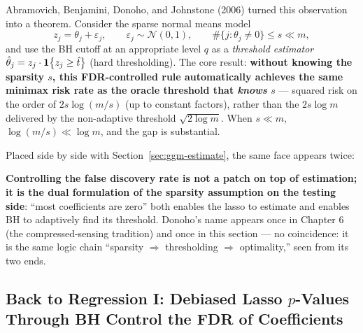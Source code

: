 Abramovich, Benjamini, Donoho, and Johnstone (2006) turned this observation into a theorem\cite{abramovich2006}. Consider the sparse normal means model
\[
  z_j = \theta_j + \varepsilon_j, \qquad \varepsilon_j \sim \mathcal{N}(0, 1),
  \qquad \#\{ j : \theta_j \neq 0 \} \le s \ll m,
\]
and use the BH cutoff at an appropriate level $q$ as a \emph{threshold estimator} $\hat\theta_j = z_j \cdot \mathbf{1}\!\left\{ z_j \ge \hat{t} \right\}$ (hard thresholding). The core result: \textbf{without knowing the sparsity $s$, this FDR-controlled rule automatically achieves the same minimax risk rate as the oracle threshold that \emph{knows} $s$} — squared risk on the order of $2 s \log(m/s)$ (up to constant factors), rather than the $2 s \log m$ delivered by the non-adaptive threshold $\sqrt{2 \log m}$. When $s \ll m$, $\log(m/s) \ll \log m$, and the gap is substantial.

Placed side by side with Section~\ref{sec:ggm-estimate}, the same face appears twice:
\begin{center}
\end{center}
\textbf{Controlling the false discovery rate is not a patch on top of estimation; it is the dual formulation of the sparsity assumption on the testing side}: ``most coefficients are zero'' both enables the lasso to estimate and enables BH to adaptively find its threshold. Donoho's name appears once in Chapter 6 (the compressed-sensing tradition) and once in this section — no coincidence: it is the same logic chain ``sparsity $\Rightarrow$ thresholding $\Rightarrow$ optimality,'' seen from its two ends.

\subsection[Back to Regression I: Debiased Lasso $p$-Values Through BH]{Back to Regression I: Debiased Lasso $p$-Values Through BH Control the FDR of Coefficients}\label{sec:fdr-regression}

